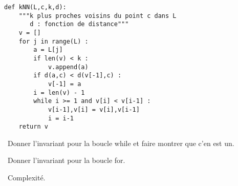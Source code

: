 \begin{lstlisting}
def kNN(L,c,k,d):
    """k plus proches voisins du point c dans L
       d : fonction de distance"""
    v = []
    for j in range(L) :
        a = L[j]
        if len(v) < k : 
            v.append(a)
        if d(a,c) < d(v[-1],c) : 
            v[-1] = a
        i = len(v) - 1 
        while i >= 1 and v[i] < v[i-1] : 
            v[i-1],v[i] = v[i],v[i-1]
            i = i-1
    return v
\end{lstlisting}

\medskip

\question\ Donner l'invariant pour la boucle while et faire montrer que c'en est un. 

\medskip

\question\ Donner l'invariant pour la boucle for. 

\medskip

\question\ Complexité. 